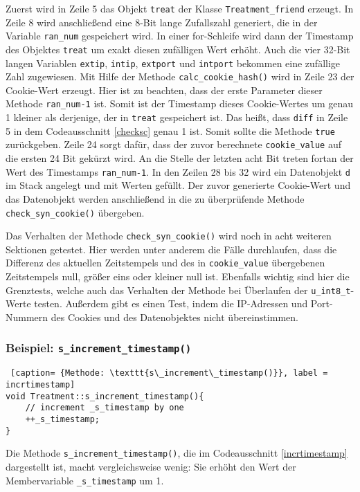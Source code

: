 \documentclass[../review_3.tex]{subfiles}
\begin{document}
Zuerst wird in Zeile 5 das Objekt \texttt{treat} der Klasse \texttt{Treatment\_friend} erzeugt. In Zeile 8 wird anschließend eine 8-Bit lange Zufallszahl generiert, die in der Variable \texttt{ran\_num} gespeichert wird. In einer for-Schleife wird dann der Timestamp des Objektes \texttt{treat} um exakt diesen zufälligen Wert erhöht. Auch die vier 32-Bit langen Variablen \texttt{extip}, \texttt{intip}, \texttt{extport} und \texttt{intport} bekommen eine zufällige Zahl zugewiesen.
Mit Hilfe der Methode \texttt{calc\_cookie\_hash()} wird in Zeile 23 der Cookie-Wert erzeugt. Hier ist zu beachten, dass der erste Parameter dieser Methode \texttt{ran\_num-1} ist. Somit ist der Timestamp dieses Cookie-Wertes um genau 1 kleiner als derjenige, der in \texttt{treat} gespeichert ist. Das heißt, dass \texttt{diff} in Zeile 5 in dem Codeausschnitt \ref{checksc} genau 1 ist. Somit sollte die Methode \texttt{true} zurückgeben.%
Zeile 24 sorgt dafür, dass der zuvor berechnete \texttt{cookie\_value} auf die ersten 24 Bit gekürzt wird. An die Stelle der letzten acht Bit treten fortan der Wert des Timestamps \texttt{ran\_num-1}.
In den Zeilen 28 bis 32 wird ein Datenobjekt \texttt{d} im Stack angelegt und mit Werten gefüllt.
Der zuvor generierte Cookie-Wert und das Datenobjekt werden anschließend in die zu überprüfende Methode \texttt{check\_syn\_cookie()} übergeben.

Das Verhalten der Methode \texttt{check\_syn\_cookie()} wird noch in acht weiteren Sektionen getestet. Hier werden unter anderem die Fälle durchlaufen, dass die Differenz des aktuellen Zeitstempels und des in \texttt{cookie\_value} übergebenen Zeitstempels null, größer eins oder kleiner null ist. Ebenfalls wichtig sind hier die Grenztests, welche auch das Verhalten der Methode bei Überlaufen der  \texttt{u\_int8\_t}-Werte testen. Außerdem gibt es einen Test, indem die IP-Adressen und Port-Nummern des Cookies und des Datenobjektes nicht übereinstimmen.
\subsubsection{Beispiel: \texttt{s\_increment\_timestamp()}}
\begin{lstlisting} [caption= {Methode: \texttt{s\_increment\_timestamp()}}, label = incrtimestamp]
void Treatment::s_increment_timestamp(){
    // increment _s_timestamp by one
    ++_s_timestamp; 
}\end{lstlisting}
Die Methode \texttt{s\_increment\_timestamp()}, die im Codeausschnitt \ref{incrtimestamp} dargestellt ist, macht vergleichsweise wenig: Sie erhöht den Wert der Membervariable \texttt{\_s\_timestamp} um 1.
\end{document}
